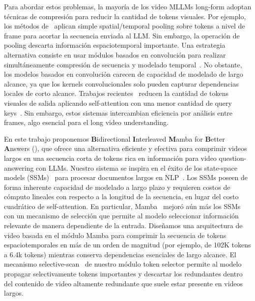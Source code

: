 Para abordar estos problemas, la mayoría de los video MLLMs long-form adoptan técnicas de compresión para reducir la cantidad de tokens visuales. Por ejemplo, los métodos de~\cite{xu2024pllavaparameterfreellava, Maaz2023VideoChatGPT} aplican simple spatial/temporal pooling sobre tokens a nivel de frame para acortar la secuencia enviada al LLM. Sin embargo, la operación de pooling descarta información espaciotemporal importante. Una estrategia alternativa consiste en usar módulos basados en convolución para realizar simultáneamente compresión de secuencia y modelado temporal~\cite{ lin2023video, liu2024kangaroo}. No obstante, los modelos basados en convolución carecen de capacidad de modelado de largo alcance, ya que los kernels convolucionales solo pueden capturar dependencias locales de corto alcance. Trabajos recientes~\cite{zhang2023video} reducen la cantidad de tokens visuales de salida aplicando self-attention con una menor cantidad de query keys~\cite{jaegle2021perceiver}. Sin embargo, estos sistemas intercambian eficiencia por análisis entre frames, algo esencial para el long video understanding.

En este trabajo proponemos {\bf B}idirectional {\bf I}nterleaved {\bf M}amba for {\bf B}etter {\bf A}nswers (\model), que ofrece una alternativa eficiente y efectiva para comprimir videos largos en una secuencia corta de tokens rica en información para video question-answering con LLMs. Nuestro sistema se inspira en el éxito de los state-space models (SSMs)~\cite{gu2020hippo, gu2021combining, gu2022efficiently, gu2022s4d, gupta2022diagonal} para procesar documentos largos en NLP~\cite{gu2023mamba}. Los SSMs poseen de forma inherente capacidad de modelado a largo plazo y requieren costos de cómputo lineales con respecto a la longitud de la secuencia, en lugar del costo cuadrático de self-attention. En particular, Mamba~\cite{gu2023mamba} mejoró aún más los SSMs con un mecanismo de selección que permite al modelo seleccionar información relevante de manera dependiente de la entrada. Diseñamos una arquitectura de video basada en el módulo Mamba para comprimir la secuencia de tokens espaciotemporales en más de un orden de magnitud (por ejemplo, de 102K tokens a 6.4k tokens) mientras conserva dependencias esenciales de largo alcance. El mecanismo selective-scan~\cite{gu2023mamba} de nuestro módulo token selector permite al modelo propagar selectivamente tokens importantes y descartar los redundantes dentro del contenido de video altamente redundante que suele estar presente en videos largos.

